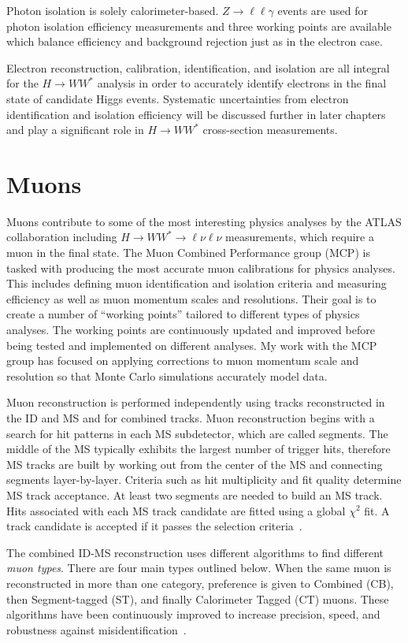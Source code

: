 Photon isolation is solely calorimeter-based. $Z\rightarrow \ell\ell\gamma$ events are used for photon isolation efficiency measurements and three working points are available which balance efficiency and background rejection just as in the electron case. 

Electron reconstruction, calibration, identification, and isolation are all integral for the $H\rightarrow WW^*$ analysis in order to accurately identify electrons in the final state of candidate Higgs events. Systematic uncertainties from electron identification and isolation efficiency will be discussed further in later chapters and play a significant role in $H\rightarrow WW^*$ cross-section measurements. 

\section{Muons}
Muons contribute to some of the most interesting physics analyses by the ATLAS collaboration including $H\rightarrow WW^*\rightarrow \ell\nu\ell\nu$ measurements, which require a muon in the final state. The Muon Combined Performance group (MCP) is tasked with producing the most accurate muon calibrations for physics analyses. This includes defining muon identification and isolation criteria and measuring efficiency as well as muon momentum scales and resolutions. Their goal is to create a number of ``working points'' tailored to different types of physics analyses. The working points are continuously updated and improved before being tested and implemented on different analyses. My work with the MCP group has focused on applying corrections to muon momentum scale and resolution so that Monte Carlo simulations accurately model data. 

Muon reconstruction is performed independently using tracks reconstructed in the ID and MS and for combined tracks. Muon reconstruction begins with a search for hit patterns in each MS subdetector, which are called segments. The middle of the MS typically exhibits the largest number of trigger hits, therefore MS tracks are built by working out from the center of the MS and connecting segments layer-by-layer. Criteria such as hit multiplicity and fit quality determine MS track acceptance. At least two segments are needed to build an MS track. Hits associated with each MS track candidate are fitted using a global $\chi^2$ fit. A track candidate is accepted if it passes the selection criteria~\cite{MCPpaper}. 

The combined ID-MS reconstruction uses different algorithms to find different \textit{muon types}. There are four main types outlined below. When the same muon is reconstructed in more than one category, preference is given to Combined (CB), then Segment-tagged (ST), and finally Calorimeter Tagged (CT) muons. These algorithms have been continuously improved to increase precision, speed, and robustness against misidentification~\cite{MCPpaper}.  

